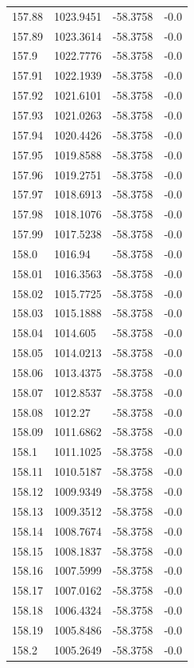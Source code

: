 \begin{table}[H]
\begin{tabular}{llll}
157.88 & 1023.9451 & -58.3758 & -0.0 \\
157.89 & 1023.3614 & -58.3758 & -0.0 \\
157.9 & 1022.7776 & -58.3758 & -0.0 \\
157.91 & 1022.1939 & -58.3758 & -0.0 \\
157.92 & 1021.6101 & -58.3758 & -0.0 \\
157.93 & 1021.0263 & -58.3758 & -0.0 \\
157.94 & 1020.4426 & -58.3758 & -0.0 \\
157.95 & 1019.8588 & -58.3758 & -0.0 \\
157.96 & 1019.2751 & -58.3758 & -0.0 \\
157.97 & 1018.6913 & -58.3758 & -0.0 \\
157.98 & 1018.1076 & -58.3758 & -0.0 \\
157.99 & 1017.5238 & -58.3758 & -0.0 \\
158.0 & 1016.94 & -58.3758 & -0.0 \\
158.01 & 1016.3563 & -58.3758 & -0.0 \\
158.02 & 1015.7725 & -58.3758 & -0.0 \\
158.03 & 1015.1888 & -58.3758 & -0.0 \\
158.04 & 1014.605 & -58.3758 & -0.0 \\
158.05 & 1014.0213 & -58.3758 & -0.0 \\
158.06 & 1013.4375 & -58.3758 & -0.0 \\
158.07 & 1012.8537 & -58.3758 & -0.0 \\
158.08 & 1012.27 & -58.3758 & -0.0 \\
158.09 & 1011.6862 & -58.3758 & -0.0 \\
158.1 & 1011.1025 & -58.3758 & -0.0 \\
158.11 & 1010.5187 & -58.3758 & -0.0 \\
158.12 & 1009.9349 & -58.3758 & -0.0 \\
158.13 & 1009.3512 & -58.3758 & -0.0 \\
158.14 & 1008.7674 & -58.3758 & -0.0 \\
158.15 & 1008.1837 & -58.3758 & -0.0 \\
158.16 & 1007.5999 & -58.3758 & -0.0 \\
158.17 & 1007.0162 & -58.3758 & -0.0 \\
158.18 & 1006.4324 & -58.3758 & -0.0 \\
158.19 & 1005.8486 & -58.3758 & -0.0 \\
158.2 & 1005.2649 & -58.3758 & -0.0 \\

\end{tabular}
\end{table}
